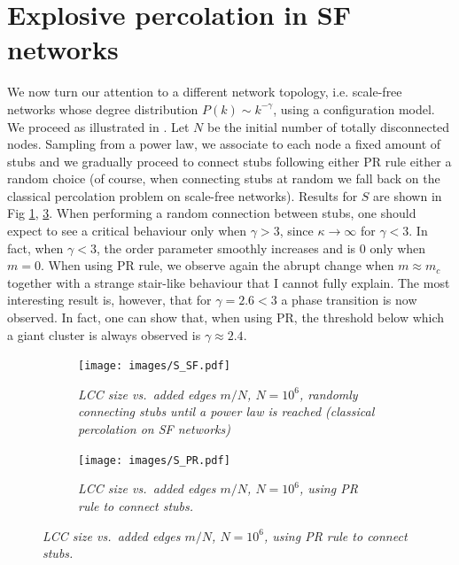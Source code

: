 \section{Explosive percolation in SF networks}
We now turn our attention to a different network topology, i.e. scale-free networks whose degree distribution $P(k) \sim k^{-\gamma}$, using a configuration model. We proceed as illustrated in \cite{bibid}. Let $N$ be the initial number of totally disconnected nodes. Sampling from a power law, we associate to each node a fixed amount of stubs and we gradually proceed to connect stubs following either PR rule either a random choice (of course, when connecting stubs at random we fall back on the classical percolation problem on scale-free networks). Results for $S$ are shown in Fig \ref{fig::RGSF}, \ref{fig::PRSF}. When performing a random connection between stubs, one should expect to see a critical behaviour only when $\gamma > 3$, since $\kappa \to \infty$ for $\gamma < 3$. In fact, when $\gamma < 3$, the order parameter smoothly increases and is $0$ only when $m = 0$. When using PR rule, we observe again the abrupt change when $m \approx m_c$ together with a strange stair-like behaviour that I cannot fully explain. The most interesting result is, however, that for $\gamma = 2.6 < 3$ a phase transition is now observed. In fact, one can show \cite{bibid} that, when using PR, the threshold below which a giant cluster is always observed is $\gamma \approx 2.4$.

\begin{figure}
	\centering
	\begin{subfigure}[t]{0.48\linewidth}
		\texttt{[image: images/S\_SF.pdf]}
		\caption{\textit{LCC size vs.\ added edges $m/N$, $N = 10^6$, randomly connecting stubs until a power law is reached (classical percolation on SF networks)}}
		\label{fig::RGSF}
	\end{subfigure}
	\hspace{3pt}
	\begin{subfigure}[t]{0.48\linewidth}
		\texttt{[image: images/S\_PR.pdf]}
		\caption{\textit{LCC size vs.\ added edges $m/N$, $N = 10^6$, using PR rule to connect stubs.} }
		\label{fig::PRSF}
	\end{subfigure}
\end{figure}


\newpage